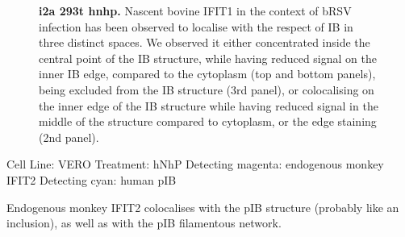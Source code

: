 \begin{figure}
\begin{subfigure}{1\textwidth}
    \end{subfigure}
    \caption[i2a 293t hnhp]{\textbf{i2a 293t hnhp.} Nascent bovine IFIT1 in the context of bRSV infection has been observed to localise with the respect of IB in three distinct spaces. We observed it either concentrated inside the central point of the IB structure, while having reduced signal on the inner IB edge, compared to the cytoplasm (top and bottom panels), being excluded from the IB structure (3rd panel), or colocalising on the inner edge of the IB structure while having reduced signal in the middle of the structure compared to cytoplasm, or the edge staining (2nd panel).}
    \label{fig:i2a 293t hnhp}
\end{figure}

Cell Line: VERO \newline
Treatment: hNhP \newline
Detecting magenta: endogenous monkey IFIT2 \newline
Detecting cyan: human pIB \newline

Endogenous monkey IFIT2 colocalises with the pIB structure (probably like an inclusion), as well as with the pIB filamentous network.

